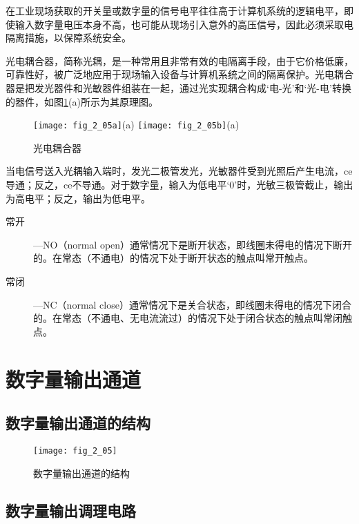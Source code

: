 在工业现场获取的开关量或数字量的信号电平往往高于计算机系统的逻辑电平，即使输入数字量电压本身不高，也可能从现场引入意外的高压信号，因此必须采取电隔离措施，以保障系统安全。


光电耦合器，简称光耦，是一种常用且非常有效的电隔离手段，由于它价格低廉，可靠性好，被广泛地应用于现场输入设备与计算机系统之间的隔离保护。光电耦合器是把发光器件和光敏器件组装在一起，通过光实现耦合构成‘电-光’和‘光-电’转换的器件，如图\ref{fig_2_05a}(a)所示为其原理图。


\begin{figure}[h]
  \centering
  \texttt{[image: fig\_2\_05a]}(a)
  \texttt{[image: fig\_2\_05b]}(a)
    \caption{光电耦合器}\label{fig_2_05a}
\end{figure}


当电信号送入光耦输入端时，发光二极管发光，光敏器件受到光照后产生电流，ce导通；反之，ce不导通。对于数字量，输入为低电平‘0’时，光敏三极管截止，输出为高电平；反之，输出为低电平。




\begin{description}
  \item[常开] —NO（normal open）通常情况下是断开状态，即线圈未得电的情况下断开的。在常态（不通电）的情况下处于断开状态的触点叫常开触点。

  \item[常闭] —NC（normal close）通常情况下是关合状态，即线圈未得电的情况下闭合的。在常态（不通电、无电流流过）的情况下处于闭合状态的触点叫常闭触点。


\end{description}




\section{数字量输出通道}

\subsection{数字量输出通道的结构}

\begin{figure}[h]
  \centering
  \texttt{[image: fig\_2\_05]}
  \caption{数字量输出通道的结构}\label{fig_2_05}
\end{figure}


\subsection{数字量输出调理电路}

